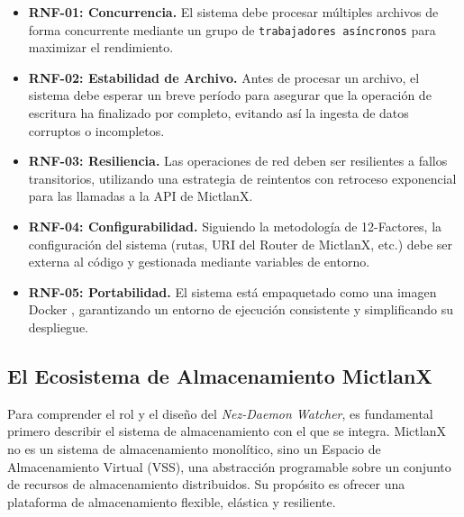 \begin{itemize}
    \item \textbf{RNF-01: Concurrencia.} El sistema debe procesar múltiples archivos de forma concurrente mediante un grupo de \texttt{trabajadores asíncronos} para maximizar el rendimiento.
    
    \item \textbf{RNF-02: Estabilidad de Archivo.} Antes de procesar un archivo, el sistema debe esperar un breve período para asegurar que la operación de escritura ha finalizado por completo, evitando así la ingesta de datos corruptos o incompletos.
    
    \item \textbf{RNF-03: Resiliencia.} Las operaciones de red deben ser resilientes a fallos transitorios, utilizando una estrategia de reintentos con retroceso exponencial para las llamadas a la API de MictlanX.
    
    \item \textbf{RNF-04: Configurabilidad.} Siguiendo la metodología de 12-Factores, la configuración del sistema (rutas, URI del Router de MictlanX, etc.) debe ser externa al código y gestionada mediante variables de entorno.
    
    \item \textbf{RNF-05: Portabilidad.} El sistema está empaquetado como una imagen Docker \cite{merkel2014docker}, garantizando un entorno de ejecución consistente y simplificando su despliegue.
\end{itemize}

\subsection{El Ecosistema de Almacenamiento MictlanX}
Para comprender el rol y el diseño del \textit{Nez-Daemon Watcher}, es fundamental primero describir el sistema de almacenamiento con el que se integra. MictlanX no es un sistema de almacenamiento monolítico, sino un Espacio de Almacenamiento Virtual (VSS), una abstracción programable sobre un conjunto de recursos de almacenamiento distribuidos. Su propósito es ofrecer una plataforma de almacenamiento flexible, elástica y resiliente.

